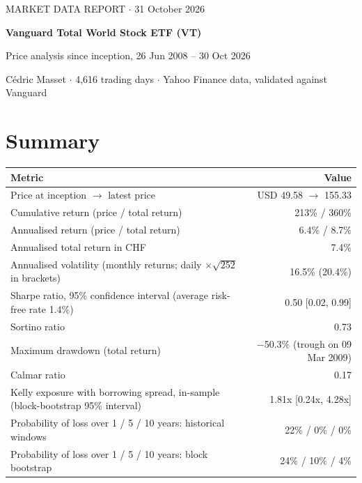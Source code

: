 \documentclass[11pt,a4paper]{article}
\begin{document}
\thispagestyle{fancy}
{%
{\footnotesize\color{muted}\MakeUppercase{Market data report} $\cdot$ 31 October 2026}\par\vspace{0.6em}
{\fontsize{22}{26}\selectfont\bfseries\color{ink} Vanguard Total World Stock ETF (VT)\par}\vspace{0.3em}
{\large\color{muted} Price analysis since inception, 26 Jun 2008 -- 30 Oct 2026\par}\vspace{0.2em}
{\small\color{muted} Cédric Masset $\cdot$ 4,616 trading days $\cdot$ Yahoo Finance data, validated against Vanguard\par}
}
\vspace{0.4em}

\section*{Summary}

\begin{table}[H]
\footnotesize
\begin{tabularx}{\linewidth}{L r}
\toprule
\textbf{Metric} & \textbf{Value} \\
\midrule
Price at inception $\rightarrow$ latest price & USD 49.58 $\rightarrow$ 155.33 \\
Cumulative return (price / total return) & 213\% / 360\% \\
Annualised return (price / total return) & 6.4\% / 8.7\% \\
Annualised total return in CHF & 7.4\% \\
Annualised volatility (monthly returns; daily $\times\sqrt{252}$ in brackets) & 16.5\% (20.4\%) \\
Sharpe ratio, 95\% confidence interval (average risk-free rate 1.4\%) & 0.50 [0.02, 0.99] \\
Sortino ratio & 0.73 \\
Maximum drawdown (total return) & $-$50.3\% (trough on 09 Mar 2009) \\
Calmar ratio & 0.17 \\
Kelly exposure with borrowing spread, in-sample (block-bootstrap 95\% interval) & 1.81x [0.24x, 4.28x] \\
Probability of loss over 1 / 5 / 10 years: historical windows & 22\% / 0\% / 0\% \\
Probability of loss over 1 / 5 / 10 years: block bootstrap & 24\% / 10\% / 4\% \\
\bottomrule
\end{tabularx}
\end{table}
\end{document}

